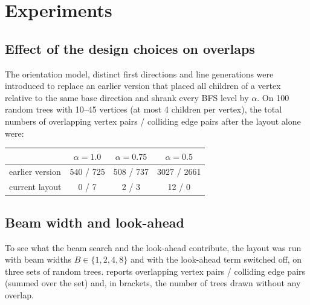 \documentclass[11pt,a4paper]{article}
\begin{document}
\section{Experiments}

\subsection{Effect of the design choices on overlaps}

The orientation model, distinct first directions and line generations were introduced to replace an earlier version that placed all children of a vertex relative to the same base direction and shrank every BFS level by $\alpha$. On 100 random trees with 10--45 vertices (at most 4 children per vertex), the total numbers of overlapping vertex pairs / colliding edge pairs after the layout alone were:

\begin{center}\small
\begin{tabular}{@{}l ccc@{}}
\toprule
 & $\alpha=1.0$ & $\alpha=0.75$ & $\alpha=0.5$\\
\midrule
earlier version & 540 / 725 & 508 / 737 & 3027 / 2661\\
current layout & 0 / 7 & 2 / 3 & 12 / 0\\
\bottomrule
\end{tabular}
\end{center}

\subsection{Beam width and look-ahead}

To see what the beam search and the look-ahead contribute, the layout was run with beam widths $B\in\{1,2,4,8\}$ and with the look-ahead term switched off, on three sets of random trees.  reports overlapping vertex pairs / colliding edge pairs (summed over the set) and, in brackets, the number of trees drawn without any overlap.
\end{document}
